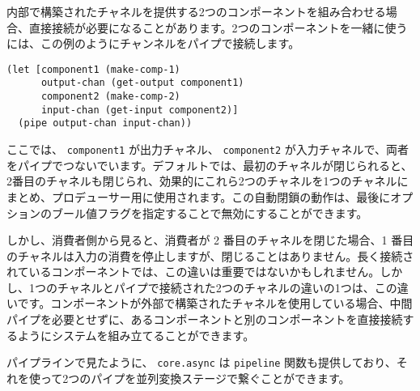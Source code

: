 内部で構築されたチャネルを提供する2つのコンポーネントを組み合わせる場合、直接接続が必要になることがあります。2つのコンポーネントを一緒に使うには、この例のようにチャンネルをパイプで接続します。


\begin{lstlisting}[numbers=none]
(let [component1 (make-comp-1)
      output-chan (get-output component1)
      component2 (make-comp-2)
      input-chan (get-input component2)]
  (pipe output-chan input-chan))
\end{lstlisting}

ここでは、 \texttt{component1} が出力チャネル、 \texttt{component2} が入力チャネルで、両者をパイプでつないでいます。デフォルトでは、最初のチャネルが閉じられると、2番目のチャネルも閉じられ、効果的にこれら2つのチャネルを1つのチャネルにまとめ、プロデューサー用に使用されます。この自動閉鎖の動作は、最後にオプションのブール値フラグを指定することで無効にすることができます。

しかし、消費者側から見ると、消費者が 2 番目のチャネルを閉じた場合、1 番目のチャネルは入力の消費を停止しますが、閉じることはありません。長く接続されているコンポーネントでは、この違いは重要ではないかもしれません。しかし、1つのチャネルとパイプで接続された2つのチャネルの違いの1つは、この違いです。コンポーネントが外部で構築されたチャネルを使用している場合、中間パイプを必要とせずに、あるコンポーネントと別のコンポーネントを直接接続するようにシステムを組み立てることができます。

パイプラインで見たように、 \texttt{core.async} は \texttt{pipeline} 関数も提供しており、それを使って2つのパイプを並列変換ステージで繋ぐことができます。

